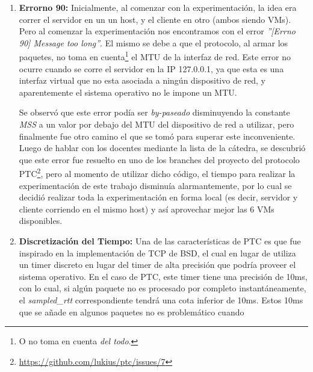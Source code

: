 \begin{enumerate}[label=(\alph*)]

    \bigskip
    \item \textbf{Errorno 90:} Inicialmente, al comenzar con la
        experimentaci\'on, la idea era correr el servidor en un un host, y el
        cliente en otro (ambos siendo VMs). Pero al comenzar la
        experimentaci\'on nos encontramos con el error \emph{''[Errno 90]
        Message too long''}. El mismo se debe a que el protocolo, al armar los
        paquetes, no toma en cuenta\footnote{O no toma en cuenta \emph{del
        todo}.} el MTU de la interfaz de red. Este error no ocurre cuando se
        corre el servidor en la IP 127.0.0.1, ya que esta es una interfaz
        virtual que no esta asociada a ning\'un dispositivo de red, y
        aparentemente el sistema operativo no le impone un MTU.

        \par Se observ\'o que este error pod\'ia ser \emph{by-paseado}
        disminuyendo la constante \emph{MSS} a un valor por debajo del MTU del
        dispositivo de red a utilizar, pero finalmente fue otro camino el que se
        tom\'o para superar este inconveniente. Luego de hablar con los docentes
        mediante la lista de la c\'atedra, se descubri\'o que este error fue
        resuelto en uno de los branches del proyecto del protocolo
        PTC\footnote{\url{https://github.com/lukius/ptc/issues/7}}, pero al
        momento de utilizar dicho c\'odigo, el tiempo para realizar la
        experimentaci\'on de este trabajo disminu\'ia alarmantemente, por lo
        cual se decidi\'o realizar toda la experimentaci\'on en forma local (es
        decir, servidor y cliente corriendo en el mismo host) y as\'i aprovechar
        mejor las 6 VMs disponibles.

    \bigskip
    \item \textbf{Discretizaci\'on del Tiempo:} Una de las caracter\'isticas de
        PTC es que fue inspirado en la implementaci\'on de TCP de BSD\cite{bsd},
        el cual en lugar de utiliza un timer discreto en lugar del timer de alta
        precisi\'on que podr\'ia proveer el sistema operativo. En el caso de
        PTC, este timer tiene una precisi\'on de 10ms, con lo cual, si alg\'un
        paquete no es procesado por completo instant\'aneamente, el
        \emph{sampled\_rtt} correspondiente tendr\'a una cota inferior de 10ms.
        Estos 10ms que se a\~nade en algunos paquetes no es problem\'atico
        cuando
        \begin{enumerate*}[label=\itshape\arabic*\upshape)]


\end{enumerate*}
\end{enumerate}
